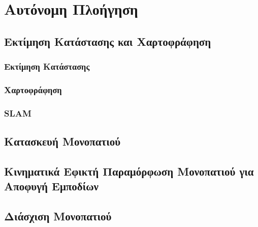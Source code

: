 
\chapter{Αυτόνομη Πλοήγηση} %

\label{Chapter3} %

\section{Εκτίμηση Κατάστασης και Χαρτοφράφηση}
\subsection{Εκτίμηση Κατάστασης}
\subsection{Χαρτοφράφηση}
\subsection{SLAM}


\section{Κατασκευή Μονοπατιού}


\section{Κινηματικά Εφικτή Παραμόρφωση Μονοπατιού για Αποφυγή Εμποδίων}


\section{Διάσχιση Μονοπατιού}